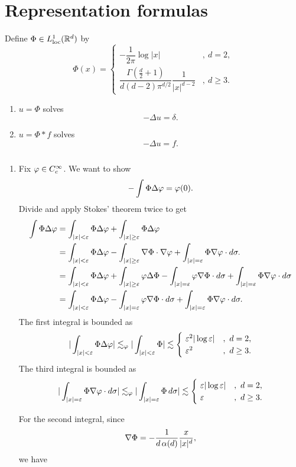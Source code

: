 \documentclass[11pt]{article}
\let\realsection\section
\renewcommand\section{\newpage\realsection}
\def\loc{\mathrm{loc}}
\begin{document}
\section{Representation formulas}

\begin{thm}
Define $\Phi\in L_\loc^1(\R^d)$ by
\[\Phi(x)
=\begin{cases}-\dfrac1{2\pi}\log|x|&,\ d=2,\\\dfrac{\Gamma(\frac d2+1)}{d(d-2)\pi^{d/2}}\dfrac1{|x|^{d-2}}&,\ d\ge3.\end{cases}
\]
\begin{enumerate}
\item
$u=\Phi$ solves
\[-\Delta u=\delta.\]
\item
$u=\Phi*f$ solves
\[-\Delta u=f.\]
\end{enumerate}
\end{thm}
\begin{pf}$ $\\[-10pt]
\begin{enumerate}
\item
Fix $\varphi\in C_c^\infty$.
We want to show
\[-\int\Phi\Delta\varphi=\varphi(0).\]
Divide and apply Stokes' theorem twice to get
\begin{align*}
\int\Phi\Delta\varphi
&=\int_{|x|<\varepsilon}\Phi\Delta\varphi+\int_{|x|\ge\varepsilon}\Phi\Delta\varphi\\
&=\int_{|x|<\varepsilon}\Phi\Delta\varphi-\int_{|x|\ge\varepsilon}\nabla\Phi\cdot\nabla\varphi+\int_{|x|=\varepsilon}\Phi\nabla\varphi\cdot d\sigma.\\
&=\int_{|x|<\varepsilon}\Phi\Delta\varphi+\int_{|x|\ge\varepsilon}\varphi\Delta\Phi-\int_{|x|=\varepsilon}\varphi\nabla\Phi\cdot d\sigma+\int_{|x|=\varepsilon}\Phi\nabla\varphi\cdot d\sigma\\
&=\int_{|x|<\varepsilon}\Phi\Delta\varphi-\int_{|x|=\varepsilon}\varphi\nabla\Phi\cdot d\sigma+\int_{|x|=\varepsilon}\Phi\nabla\varphi\cdot d\sigma.
\end{align*}
The first integral is bounded as
\[|\int_{|x|<\e}\Phi\Delta\f|\les_\f|\int_{|x|<\e}\Phi|\les\begin{cases}\ \e^2|\log\e|&,\ d=2,\\\ \e^2&,\ d\ge3.\end{cases}\]
The third integral is bounded as
\[|\int_{|x|=\e}\Phi\del\f\cdot d\sigma|\les_\f|\int_{|x|=\e}\Phi\,d\sigma|\les\begin{cases}\ \e|\log\e|&,\ d=2,\\\ \e&,\ d\ge3.\end{cases}\]

For the second integral, since
\[\nabla\Phi=-\frac1{d\,\alpha(d)}\frac x{|x|^d},\]
we have
\end{enumerate}
\end{pf}
\end{document}
